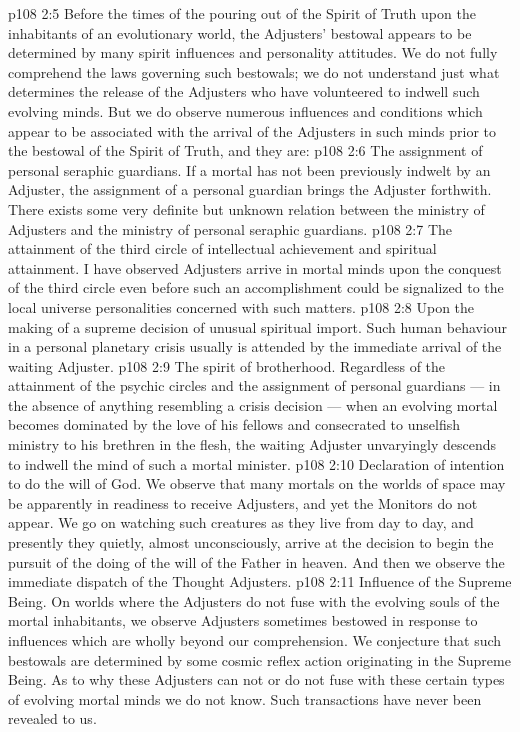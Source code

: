 \vs p108 2:5 Before the times of the pouring out of the Spirit of Truth upon the inhabitants of an evolutionary world, the Adjusters’ bestowal appears to be determined by many spirit influences and personality attitudes. We do not fully comprehend the laws governing such bestowals; we do not understand just what determines the release of the Adjusters who have volunteered to indwell such evolving minds. But we do observe numerous influences and conditions which appear to be associated with the arrival of the Adjusters in such minds prior to the bestowal of the Spirit of Truth, and they are:
\vs p108 2:6 \bibnobreakspace The assignment of personal seraphic guardians. If a mortal has not been previously indwelt by an Adjuster, the assignment of a personal guardian brings the Adjuster forthwith. There exists some very definite but unknown relation between the ministry of Adjusters and the ministry of personal seraphic guardians.
\vs p108 2:7 \bibnobreakspace The attainment of the third circle of intellectual achievement and spiritual attainment. I have observed Adjusters arrive in mortal minds upon the conquest of the third circle even before such an accomplishment could be signalized to the local universe personalities concerned with such matters.
\vs p108 2:8 \bibnobreakspace Upon the making of a supreme decision of unusual spiritual import. Such human behaviour in a personal planetary crisis usually is attended by the immediate arrival of the waiting Adjuster.
\vs p108 2:9 \bibnobreakspace The spirit of brotherhood. Regardless of the attainment of the psychic circles and the assignment of personal guardians --- in the absence of anything resembling a crisis decision --- when an evolving mortal becomes dominated by the love of his fellows and consecrated to unselfish ministry to his brethren in the flesh, the waiting Adjuster unvaryingly descends to indwell the mind of such a mortal minister.
\vs p108 2:10 \bibnobreakspace Declaration of intention to do the will of God. We observe that many mortals on the worlds of space may be apparently in readiness to receive Adjusters, and yet the Monitors do not appear. We go on watching such creatures as they live from day to day, and presently they quietly, almost unconsciously, arrive at the decision to begin the pursuit of the doing of the will of the Father in heaven. And then we observe the immediate dispatch of the Thought Adjusters.
\vs p108 2:11 \bibnobreakspace Influence of the Supreme Being. On worlds where the Adjusters do not fuse with the evolving souls of the mortal inhabitants, we observe Adjusters sometimes bestowed in response to influences which are wholly beyond our comprehension. We conjecture that such bestowals are determined by some cosmic reflex action originating in the Supreme Being. As to why these Adjusters can not or do not fuse with these certain types of evolving mortal minds we do not know. Such transactions have never been revealed to us.

